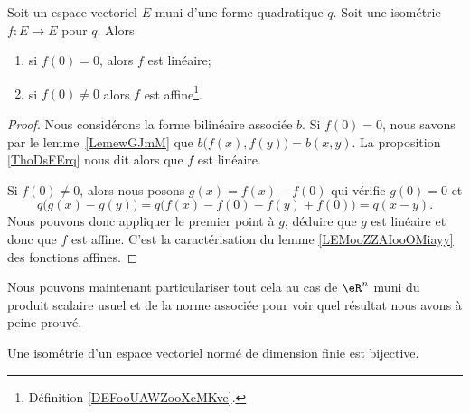 {}

\begin{theorem}
	Soit un espace vectoriel \( E\) muni d'une forme quadratique \( q\). Soit une isométrie \( f\colon E\to E\) pour \( q\). Alors
	\begin{enumerate}
		\item
		      si \( f(0)=0\), alors \( f\) est linéaire;
		\item
		      si \( f(0)\neq 0\) alors \( f\) est affine\footnote{Définition \ref{DEFooUAWZooXcMKve}.}.

	\end{enumerate}
\end{theorem}

\begin{proof}
	Nous considérons la forme bilinéaire associée \( b\). Si \( f(0)=0\), nous savons par le lemme~\ref{LemewGJmM} que \( b\big( f(x),f(y) \big)=b(x,y)\). La proposition \ref{ThoDsFErq} nous dit alors que \( f\) est linéaire.


	Si \( f(0)\neq 0\), alors nous posons \( g(x)=f(x)-f(0)\) qui vérifie \( g(0)=0\) et
	\begin{equation}
		q\big( g(x)-g(y) \big)=q\big( f(x)-f(0)-f(y)+f(0) \big)=q(x-y).
	\end{equation}
	Nous pouvons donc appliquer le premier point à \( g\), déduire que \( g\) est linéaire et donc que \( f\) est affine. C'est la caractérisation du lemme \ref{LEMooZZAIooOMiayy} des fonctions affines.
\end{proof}

Nous pouvons maintenant particulariser tout cela au cas de \( \eR^n\) muni du produit scalaire usuel et de la norme associée pour voir quel résultat nous avons à peine prouvé.

\begin{lemma}        \label{LEMooJPYZooHETCqt}
	Une isométrie d'un espace vectoriel normé de dimension finie est bijective.
\end{lemma}


